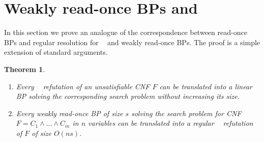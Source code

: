 \documentclass[a4paper,11pt,draft]{article}
\newtheorem{theorem}{Theorem}
\theoremstyle{definition}
\theoremstyle{remark}
\DeclareMathOperator{\reslin}{\mathsf{Res}[\oplus]}
\newcommand{\wreadonce}{weakly read-once}
\newcommand{\Wreadonce}{Weakly read-once}
\begin{document}
\section{\texorpdfstring{\Wreadonce{} BPs and $\reslin$}{\Wreadonce{} BPs and Res[+]}}

In this section we prove an analogue of the correspondence between read-once BPs and regular resolution for $\reslin$ and \wreadonce{} BPs. The proof is a simple extension of standard arguments.

\begin{theorem}\label{thm:res-bp}\leavevmode
  \begin{enumerate}
      \item Every $\reslin$ refutation of an unsatisfiable CNF $F$ can be translated into a linear BP solving the corresponding search problem without increasing its size.

      \item Every \wreadonce{} BP of size $s$ solving the search problem for CNF $F = C_1 \wedge \ldots \wedge C_m$ in $n$ variables can be translated into a regular $\reslin$ refutation of $F$ of size $O(ns)$.
%
  \end{enumerate}
%
\end{theorem}
\end{document}
